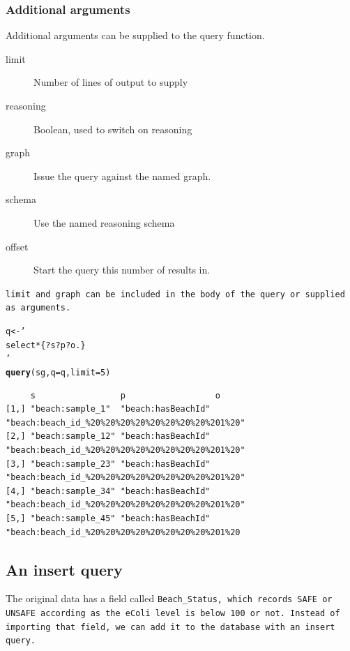 \documentclass{article}\usepackage[]{graphicx}\usepackage[]{xcolor}
\makeatletter
\newcommand{\hlnum}[1]{\textcolor[rgb]{0.686,0.059,0.569}{#1}}%
\newcommand{\hlstr}[1]{\textcolor[rgb]{0.192,0.494,0.8}{#1}}%
\newcommand{\hlstd}[1]{\textcolor[rgb]{0.345,0.345,0.345}{#1}}%
\newcommand{\hlkwb}[1]{\textcolor[rgb]{0.69,0.353,0.396}{#1}}%
\newcommand{\hlkwc}[1]{\textcolor[rgb]{0.333,0.667,0.333}{#1}}%
\newcommand{\hlkwd}[1]{\textcolor[rgb]{0.737,0.353,0.396}{\textbf{#1}}}%
\newenvironment{kframe}{%
 \def\at@end@of@kframe{}%
 \ifinner\ifhmode%
  \def\at@end@of@kframe{\end{minipage}}%
  \begin{minipage}{\columnwidth}%
 \fi\fi%
 \def\FrameCommand##1{\hskip\@totalleftmargin \hskip-\fboxsep
 \colorbox{shadecolor}{##1}\hskip-\fboxsep
     \hskip-\linewidth \hskip-\@totalleftmargin \hskip\columnwidth}%
 \MakeFramed {\advance\hsize-\width
   \@totalleftmargin\z@ \linewidth\hsize
   \@setminipage}}%
 {\par\unskip\endMakeFramed%
 \at@end@of@kframe}
\newenvironment{knitrout}{}{} %
\makeatother
\begin{document}
\subsubsection{Additional arguments}

Additional arguments can be supplied to the query function.

\begin{description}
  \item[limit] Number of lines of output to supply
  \item[reasoning] Boolean, used to switch on reasoning
  \item[graph] Issue the query against the named graph.
  \item[schema] Use the named reasoning schema
  \item[offset] Start the query this number of results in.
\end{description}

\tt{limit} and \tt{graph} can be included in the body of the query or supplied as arguments.

\begin{knitrout}
\color{fgcolor}\begin{kframe}
\begin{alltt}
\hlstd{q} \hlkwb{<-} \hlstr{'
select * \{?s ?p ?o .\}
'}
\hlkwd{query}\hlstd{(sg,} \hlkwc{q} \hlstd{= q,} \hlkwc{limit} \hlstd{=} \hlnum{5}\hlstd{)}
\end{alltt}
\end{kframe}
\end{knitrout}

\begin{verbatim}
     s                 p                  o
[1,] "beach:sample_1"  "beach:hasBeachId" "beach:beach_id_%20%20%20%20%20%20%20%20%201%20"
[2,] "beach:sample_12" "beach:hasBeachId" "beach:beach_id_%20%20%20%20%20%20%20%20%201%20"
[3,] "beach:sample_23" "beach:hasBeachId" "beach:beach_id_%20%20%20%20%20%20%20%20%201%20"
[4,] "beach:sample_34" "beach:hasBeachId" "beach:beach_id_%20%20%20%20%20%20%20%20%201%20"
[5,] "beach:sample_45" "beach:hasBeachId" "beach:beach_id_%20%20%20%20%20%20%20%20%201%20
\end{verbatim}

\subsection{An insert query}

The original data has a field called \tt{Beach\_Status}, which records SAFE or UNSAFE according as the eColi level is below 100 or not. Instead of importing that field, we can add it to the database with an insert query.
\end{document}
